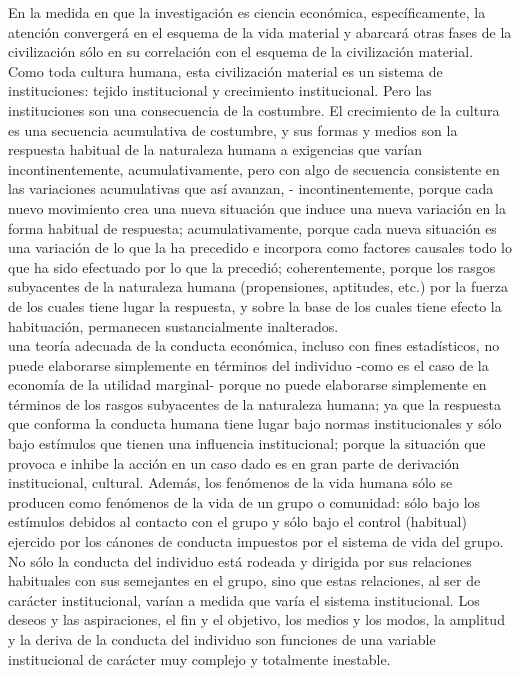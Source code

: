 En la medida en que la investigación es ciencia económica, específicamente, la atención convergerá en el esquema de la vida material y abarcará otras fases de la civilización sólo en su correlación con el esquema de la civilización material.\\

Como toda cultura humana, esta civilización material es un sistema de instituciones: tejido institucional y crecimiento institucional. Pero las instituciones son una consecuencia de la costumbre. El crecimiento de la cultura es una secuencia acumulativa de costumbre, y sus formas y medios son la respuesta habitual de la naturaleza humana a exigencias que varían incontinentemente, acumulativamente, pero con algo de secuencia consistente en las variaciones acumulativas que así avanzan, - incontinentemente, porque cada nuevo movimiento crea una nueva situación que induce una nueva variación en la forma habitual de respuesta; acumulativamente, porque cada nueva situación es una variación de lo que la ha precedido e incorpora como factores causales todo lo que ha sido efectuado por lo que la precedió; coherentemente, porque los rasgos subyacentes de la naturaleza humana (propensiones, aptitudes, etc.) por la fuerza de los cuales tiene lugar la respuesta, y sobre la base de los cuales tiene efecto la habituación, permanecen sustancialmente inalterados.\\

una teoría adecuada de la conducta económica, incluso con fines estadísticos, no puede elaborarse simplemente en términos del individuo -como es el caso de la economía de la utilidad marginal- porque no puede elaborarse simplemente en términos de los rasgos subyacentes de la naturaleza humana; ya que la respuesta que conforma la conducta humana tiene lugar bajo normas institucionales y sólo bajo estímulos que tienen una influencia institucional; porque la situación que provoca e inhibe la acción en un caso dado es en gran parte de derivación institucional, cultural. Además, los fenómenos de la vida humana sólo se producen como fenómenos de la vida de un grupo o comunidad: sólo bajo los estímulos debidos al contacto con el grupo y sólo bajo el control (habitual) ejercido por los cánones de conducta impuestos por el sistema de vida del grupo. No sólo la conducta del individuo está rodeada y dirigida por sus relaciones habituales con sus semejantes en el grupo, sino que estas relaciones, al ser de carácter institucional, varían a medida que varía el sistema institucional. Los deseos y las aspiraciones, el fin y el objetivo, los medios y los modos, la amplitud y la deriva de la conducta del individuo son funciones de una variable institucional de carácter muy complejo y totalmente inestable.\\

